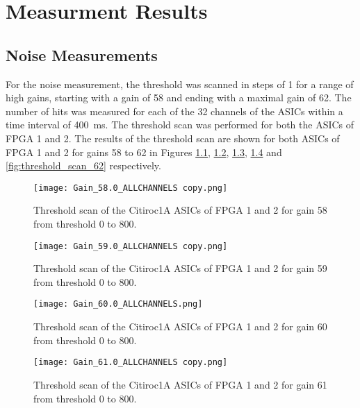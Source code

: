 \chapter{Measurment Results}\label{cha:results}
\noindent
\section{Noise Measurements}
For the noise measurement, the threshold was scanned in steps of 1 for a range of high gains,
starting with a gain of 58 and ending with a maximal gain of 62.
\newline
The number of hits was measured for each of the 32 channels of the ASICs within a time interval of \SI{400}{\milli\second}.
The threshold scan was performed for both the ASICs of FPGA 1 and 2.
\newline
The results of the threshold scan are shown for both ASICs of FPGA 1 and 2 for gains 58 to 62 in Figures \ref{fig:threshold_scan_58}, \ref{fig:threshold_scan_59}, \ref{fig:threshold_scan_60}, \ref{fig:threshold_scan_61} and \ref{fig:threshold_scan_62} respectively.

    \begin{figure}[H]
        \centering
        \texttt{[image: Gain\_58.0\_ALLCHANNELS copy.png]}
        \caption{Threshold scan of the Citiroc1A ASICs of FPGA 1 and 2 for gain 58 from threshold 0 to 800.}
        \label{fig:threshold_scan_58}
    \end{figure}
    
    \begin{figure}[H]
        \centering
        \texttt{[image: Gain\_59.0\_ALLCHANNELS copy.png]}
        \caption{Threshold scan of the Citiroc1A ASICs of FPGA 1 and 2 for gain 59 from threshold 0 to 800.}
        \label{fig:threshold_scan_59}
    \end{figure}
    
    \begin{figure}[H]
        \centering
        \texttt{[image: Gain\_60.0\_ALLCHANNELS.png]}
        \caption{Threshold scan of the Citiroc1A ASICs of FPGA 1 and 2 for gain 60 from threshold 0 to 800.}
        \label{fig:threshold_scan_60}
    \end{figure}
    
    \begin{figure}[H]
        \centering
        \texttt{[image: Gain\_61.0\_ALLCHANNELS copy.png]}
        \caption{Threshold scan of the Citiroc1A ASICs of FPGA 1 and 2 for gain 61 from threshold 0 to 800.}
        \label{fig:threshold_scan_61}
    \end{figure}
    
